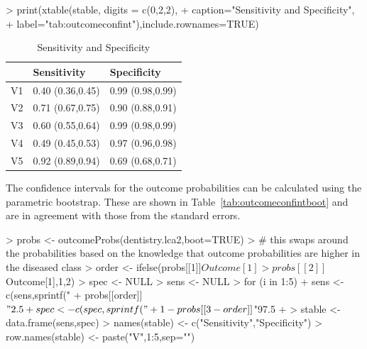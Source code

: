 \begin{Schunk}
\begin{Sinput}
> print(xtable(stable, digits = c(0,2,2),
+ 	caption="Sensitivity and Specificity",
+ 	label="tab:outcomeconfint"),include.rownames=TRUE)
\end{Sinput}
\begin{table}[ht]
\centering
\begin{tabular}{rll}
  \hline
 & Sensitivity & Specificity \\ 
  \hline
V1 & 0.40 (0.36,0.45) & 0.99 (0.98,0.99) \\ 
  V2 & 0.71 (0.67,0.75) & 0.90 (0.88,0.91) \\ 
  V3 & 0.60 (0.55,0.64) & 0.99 (0.98,0.99) \\ 
  V4 & 0.49 (0.45,0.53) & 0.97 (0.96,0.98) \\ 
  V5 & 0.92 (0.89,0.94) & 0.69 (0.68,0.71) \\ 
   \hline
\end{tabular}
\caption{Sensitivity and Specificity} 
\label{tab:outcomeconfint}
\end{table}\end{Schunk}


The confidence intervals for the outcome probabilities can be calculated using the parametric bootstrap. These are shown in Table~\ref{tab:outcomeconfintboot} and are in agreement with those from the standard errors.


\begin{Schunk}
\begin{Sinput}
> probs <- outcomeProbs(dentistry.lca2,boot=TRUE)
> # this swaps around the probabilities based on the knowledge that outcome probabilities are higher in the diseased class
> order <- ifelse(probs[[1]]$Outcome[1]>probs[[2]]$Outcome[1],1,2)
> spec <- NULL
> sens <- NULL
> for (i in 1:5) {
+ 	sens <- c(sens,sprintf("%
+       probs[[order]]$"2.5 %
+ 	spec <- c(spec,sprintf("%
+       1-probs[[3-order]]$"97.5 %
+ }
> stable <- data.frame(sens,spec)
> names(stable) <- c("Sensitivity","Specificity")
> row.names(stable) <- paste("V",1:5,sep="")
\end{Sinput}
\end{Schunk}

